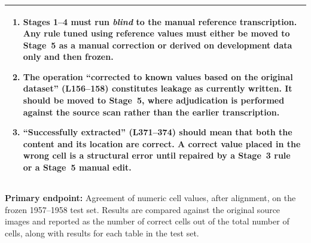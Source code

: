 \documentclass[12pt]{article}
\begin{document}
\begin{table}[ht]
\begin{tabular}{|p{0.8cm}|p{3.2cm}|p{6.2cm}|p{3.2cm}|}
\multicolumn{4}{|p{13.8cm}|}{%
\begin{enumerate}
    \item Stages 1--4 must run \emph{blind} to the manual reference transcription. Any rule tuned using reference values must either be moved to Stage~5 as a manual correction or derived on development data only and then frozen.
    \item The operation ``corrected to known values based on the original dataset'' (L156--158) constitutes leakage as currently written. It should be moved to Stage~5, where adjudication is performed against the source scan rather than the earlier transcription.
    \item ``Successfully extracted'' (L371--374) should mean that both the content and its location are correct. A correct value placed in the wrong cell is a structural error until repaired by a Stage~3 rule or a Stage~5 manual edit.
\end{enumerate}
} \\
\hline
\end{tabular}

\label{tab:stages}
\end{table}

\textbf{Primary endpoint:} Agreement of numeric cell values, after alignment, on the frozen 1957--1958 test set. Results are compared against the original source images and reported as the number of correct cells out of the total number of cells, along with results for each table in the test set.
\end{document}

